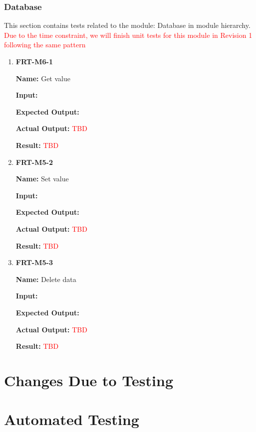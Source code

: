 \documentclass[12pt, titlepage]{article}
\begin{document}
\subsubsection{Database}
This section contains tests related to the module: Database in module hierarchy. \textcolor{red}{Due to the time constraint, we will finish unit tests for this module in Revision 1 following the same pattern}
\begin{enumerate}
\item \textbf{FRT-M6-1}

\textbf{Name:} Get value

\textbf{Input:} 

\textbf{Expected Output:} 

\textbf{Actual Output:} \textcolor{red}{TBD}

\textbf{Result:} \textcolor{red}{TBD}

\item \textbf{FRT-M5-2}

\textbf{Name:} Set value

\textbf{Input:} 

\textbf{Expected Output:} 

\textbf{Actual Output:} \textcolor{red}{TBD}

\textbf{Result:} \textcolor{red}{TBD}

\item \textbf{FRT-M5-3}

\textbf{Name:} Delete data

\textbf{Input:} 

\textbf{Expected Output:} 

\textbf{Actual Output:} \textcolor{red}{TBD}

\textbf{Result:} \textcolor{red}{TBD}
\end{enumerate}

\section{Changes Due to Testing}


\section{Automated Testing}
		
\end{document}
